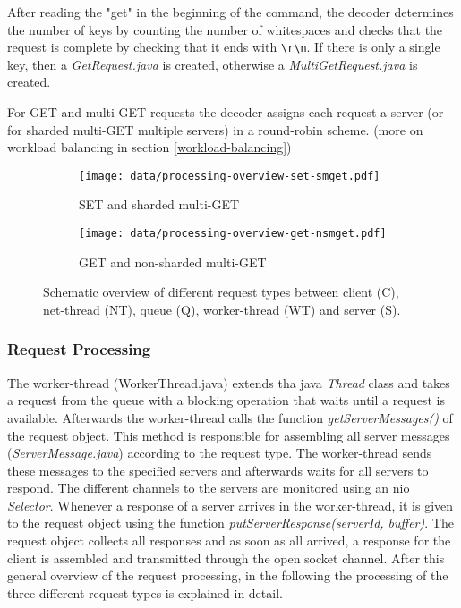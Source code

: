 \documentclass[report.tex]{subfiles}
\begin{document}
After reading the "get" in the beginning of the command, the decoder determines the number of keys by counting the number of whitespaces and checks that the request is complete by checking that it ends with \texttt{\textbackslash r\textbackslash n}. If there is only a single key, then a \emph{GetRequest.java} is created, otherwise a \emph{MultiGetRequest.java} is created.

For GET and multi-GET requests the decoder assigns each request a server (or for sharded multi-GET multiple servers) in a round-robin scheme. (more on workload balancing in section \ref{workload-balancing})




\begin{figure}[H]
	\begin{subfigure}[b]{.45\linewidth}
		\centering
		\texttt{[image: data/processing-overview-set-smget.pdf]}
		\caption{SET and sharded multi-GET}\label{processing-set-smget}
	\end{subfigure}\hfill
	\begin{subfigure}[b]{.45\linewidth}
		\centering
		\texttt{[image: data/processing-overview-get-nsmget.pdf]}
		\caption{GET and non-sharded multi-GET}\label{processing-get-nsmget}
	\end{subfigure}
\caption{Schematic overview of different request types between client (C), net-thread (NT), queue (Q), worker-thread (WT) and server (S).}
\end{figure}

\subsubsection{Request Processing}\label{request-processing}
The worker-thread (WorkerThread.java) extends tha java \emph{Thread} class and takes a request from the queue with a blocking operation that waits until a request is available.
Afterwards the worker-thread calls the function \emph{getServerMessages()} of the request object.
This method is responsible for assembling all server messages (\emph{ServerMessage.java}) according to the request type.
The worker-thread sends these messages to the specified servers and afterwards waits for all servers to respond.
The different channels to the servers are monitored using an nio \emph{Selector}. Whenever a response of a server arrives in the worker-thread, it is given to the request object using the function \emph{putServerResponse(serverId, buffer)}. The request object collects all responses and as soon as all arrived, a response for the client is assembled and transmitted through the open socket channel. After this general overview of the request processing, in the following the processing of the three different request types is explained in detail.
\end{document}
